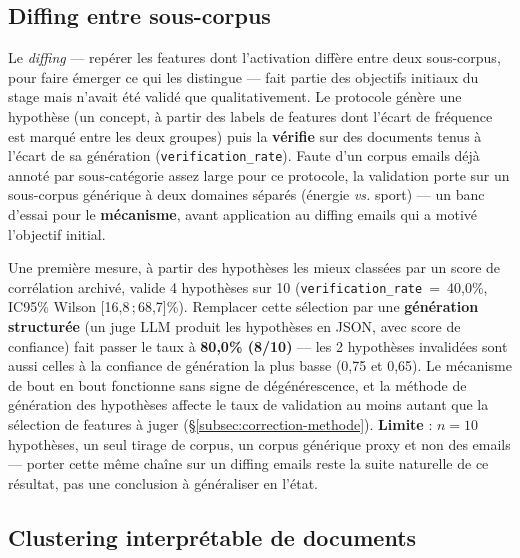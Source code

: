 \documentclass[11pt]{article}
\begin{document}
\subsection{Diffing entre sous-corpus}
\label{subsec:diffing}

Le \emph{diffing} --- repérer les features dont l'activation diffère entre
deux sous-corpus, pour faire émerger ce qui les distingue --- fait partie des
objectifs initiaux du stage mais n'avait été validé que qualitativement.
Le protocole génère une hypothèse (un concept, à partir des labels de
features dont l'écart de fréquence est marqué entre les deux groupes) puis la
\textbf{vérifie} sur des documents tenus à l'écart de sa génération
(\texttt{verification\_rate}). Faute d'un corpus emails déjà annoté par
sous-catégorie assez large pour ce protocole, la validation porte sur un
sous-corpus générique à deux domaines séparés (énergie \emph{vs.} sport) ---
un banc d'essai pour le \textbf{mécanisme}, avant application au diffing
emails qui a motivé l'objectif initial.

\begin{diagnosticbox}[Résultat exploratoire --- diffing sur corpus proxy ($n{=}10$ hypothèses)]
Une première mesure, à partir des hypothèses les mieux classées par un score
de corrélation archivé, valide 4 hypothèses sur 10
(\texttt{verification\_rate}~=~40,0\%, IC95\% Wilson [16,8\,;\,68,7]\%).
Remplacer cette sélection par une \textbf{génération structurée} (un juge LLM
produit les hypothèses en JSON, avec score de confiance) fait passer le taux
à \textbf{80,0\% (8/10)} --- les 2 hypothèses invalidées sont aussi celles à
la confiance de génération la plus basse (0,75 et 0,65). Le mécanisme de bout
en bout fonctionne sans signe de dégénérescence, et la méthode de génération
des hypothèses affecte le taux de validation au moins autant que la sélection
de features à juger (\S\ref{subsec:correction-methode}). \textbf{Limite} :
$n=10$ hypothèses, un seul tirage de corpus, un corpus générique proxy et non
des emails --- porter cette même chaîne sur un diffing emails reste la suite
naturelle de ce résultat, pas une conclusion à généraliser en l'état.
\end{diagnosticbox}

\subsection{Clustering interprétable de documents}
\label{subsec:clustering}
\end{document}

